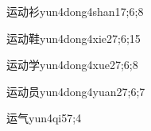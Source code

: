 \begin{verbete}{运动衫}{yun4dong4shan1}{7;6;8}
\end{verbete}

\begin{verbete}{运动鞋}{yun4dong4xie2}{7;6;15}
\end{verbete}

\begin{verbete}{运动学}{yun4dong4xue2}{7;6;8}
\end{verbete}

\begin{verbete}{运动员}{yun4dong4yuan2}{7;6;7}
\end{verbete}

\begin{verbete}{运气}{yun4qi5}{7;4}
\end{verbete}

